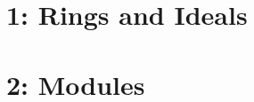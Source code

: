 \documentclass[10pt]{report}
\begin{document}
\chapter*{1: Rings and Ideals}



 






\chapter*{2: Modules}



\end{document}
